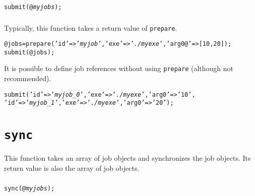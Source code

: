\documentclass[a4paper,10pt]{report}
\begin{document}
\subsubsection{\format}
\begin{boxnote}
\begin{alltt}
submit(@\textit{myjobs});
\end{alltt}
\end{boxnote}
\vspace{\baselineskip}

\subsubsection{\example}
Typically, this function takes a return value of \texttt{prepare}.
\begin{boxnote}
\begin{alltt}
@jobs = prepare('id' => '\textit{myjob}', 'exe' => '\textit{./myexe}', 'arg0@' => [10,20]);
submit(@jobs);
\end{alltt}
\end{boxnote}
\vspace{\baselineskip}
It is possible to define job references without using
\texttt{prepare} (although not recommended).
\begin{boxnote}
\begin{alltt}
submit({'id' => '\textit{myjob_0}', 'exe' => '\textit{./myexe}', 'arg0' => '10'},
       {'id' => '\textit{myjob_1}', 'exe' => '\textit{./myexe}', 'arg0' => '20'});
\end{alltt}
\end{boxnote}

\section{\texttt{sync}}

This function takes an array of job objects and synchronizes the job objects.
Its return value is also the array of job objects.

\subsubsection{\format}

\begin{boxnote}
\begin{alltt}
sync(\textit{@myjobs});
\end{alltt}
\end{boxnote}
\vspace{\baselineskip}
\end{document}
